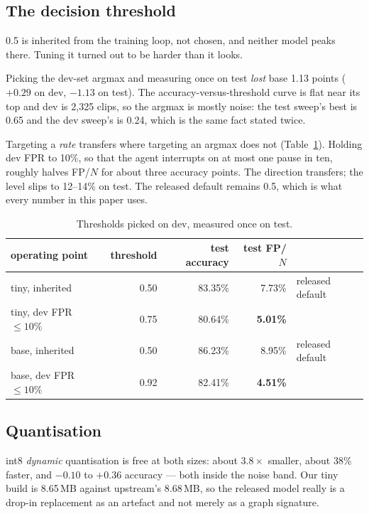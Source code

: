 \documentclass[11pt]{article}
\newcommand{\pct}{\%}
\begin{document}
\subsection{The decision threshold}

0.5 is inherited from the training loop, not chosen, and neither model peaks
there. Tuning it turned out to be harder than it looks.

Picking the dev-set argmax and measuring once on test \emph{lost} base 1.13
points ($+0.29$ on dev, $-1.13$ on test). The accuracy-versus-threshold curve is
flat near its top and dev is 2,325 clips, so the argmax is mostly noise: the
test sweep's best is 0.65 and the dev sweep's is 0.24, which is the same fact
stated twice.

Targeting a \emph{rate} transfers where targeting an argmax does not
(Table~\ref{tab:thresholds}). Holding dev FPR to 10\pct{}, so that the agent
interrupts on at most one pause in ten, roughly halves FP/$N$ for about three
accuracy points. The direction transfers; the level slips to 12--14\pct{} on
test. The released default remains 0.5, which is what every number in this paper
uses.

\begin{table}[h]
\centering\small
\begin{tabular}{lrrrl}
\toprule
operating point & threshold & test accuracy & test FP/$N$ & \\
\midrule
tiny, inherited & 0.50 & 83.35\pct & 7.73\pct & released default \\
tiny, dev FPR $\le 10\pct$ & 0.75 & 80.64\pct & \textbf{5.01\pct} & \\
base, inherited & 0.50 & 86.23\pct & 8.95\pct & released default \\
base, dev FPR $\le 10\pct$ & 0.92 & 82.41\pct & \textbf{4.51\pct} & \\
\bottomrule
\end{tabular}
\caption{Thresholds picked on dev, measured once on test.}
\label{tab:thresholds}
\end{table}

\subsection{Quantisation}
\label{sec:quant}

int8 \emph{dynamic} quantisation is free at both sizes: about $3.8\times$
smaller, about 38\pct{} faster, and $-0.10$ to $+0.36$ accuracy --- both inside
the noise band. Our tiny build is 8.65\,MB against upstream's 8.68\,MB, so the
released model really is a drop-in replacement as an artefact and not merely as
a graph signature.
\end{document}

